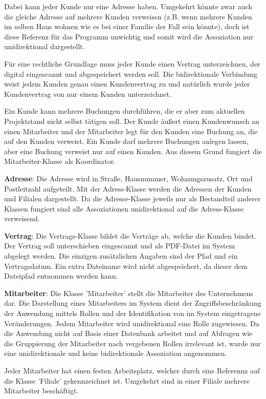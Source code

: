 Dabei kann jeder Kunde nur eine Adresse haben. Umgekehrt könnte zwar auch die gleiche Adresse auf mehrere Kunden verweisen (z.B. wenn mehrere Kunden im selben Haus wohnen wie es bei einer Familie der Fall sein könnte), doch ist diese Referenz für das Programm unwichtig und somit wird die Assoziation nur unidirektional dargestellt. 

Für eine rechtliche Grundlage muss jeder Kunde einen Vertrag unterzeichnen, der digital eingescannt und abgespeichert werden soll. Die bidirektionale Verbindung weist jedem Kunden genau einen Kundenvertrag zu und natürlich wurde jeder Kundenvertrag von nur einem Kunden unterzeichnet. 

Ein Kunde kann mehrere Buchungen durchführen, die er aber zum aktuellen Projektstand nicht selbst tätigen soll. Der Kunde äußert einen Kundenwunsch an einen Mitarbeiter und der Mitarbeiter legt für den Kunden eine Buchung an, die auf den Kunden verweist. Ein Kunde darf mehrere Buchungen anlegen lassen, aber eine Buchung verweist nur auf einen Kunden. Aus diesem Grund fungiert die Mitarbeiter-Klasse als Koordinator.  

\textbf{Adresse}: Die Adresse wird in Straße, Hausnummer, Wohnungszusatz, Ort und Postleitzahl aufgeteilt. Mit der Adress-Klasse werden die Adressen der Kunden und Filialen dargestellt. Da die Adresse-Klasse jeweils nur als Bestandteil anderer Klassen fungiert sind alle Assoziationen unidirektional auf die Adress-Klasse verweisend. 

\textbf{Vertrag}: Die Vertrags-Klasse bildet die Verträge ab, welche die Kunden bindet. Der Vertrag soll unterschieben eingescannt und als PDF-Datei im System abgelegt werden. Die einzigen zusätzlichen Angaben sind der Pfad und ein Vertragsdatum. Ein extra Dateiname wird nicht abgespeichert, da dieser dem Dateipfad entnommen werden kann.

\textbf{Mitarbeiter}: Die Klasse 'Mitarbeiter' stellt die Mitarbeiter des Unternehmens dar. Die Darstellung eines Mitarbeiters im System dient der Zugriffsbeschränkung der Anwendung mittels Rollen und der Identifikation von im System eingetragene Veränderungen. Jedem Mitarbeiter wird unidirektional eine Rolle zugewiesen. Da die Anwendung nicht auf Basis einer Datenbank arbeitet und auf Abfragen wie die Gruppierung der Mitarbeiter nach vergebenen Rollen irrelevant ist, wurde nur eine unidirektionale und keine bidirektionale Assoziation angenommen.

Jeder Mitarbeiter hat einen festen Arbeitsplatz, welcher durch eine Referennz auf die Klasse 'Filiale' gekennzeichnet ist. Umgekehrt sind in einer Filiale mehrere Mitarbeiter beschäftigt. 

